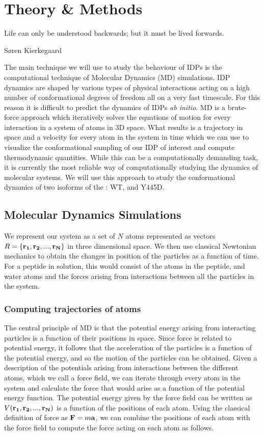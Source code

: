 \chapter{Theory \& Methods}
\epigraph{Life can only be understood backwards; but it must be lived forwards.}{S{\o}ren Kierkegaard}

The main technique we will use to study the behaviour of IDPs is the computational technique of Molecular Dynamics (MD) simulations. IDP dynamics are shaped by various types of physical interactions acting on a high number of conformational degrees of freedom all on a very fast timescale. For this reason it is difficult to predict the dynamics of IDPs {\it ab initio}. MD is a brute-force approach which iteratively solves the equations of motion for every interaction in a system of atoms in 3D space.  What results is a trajectory in space and a velocity for every atom in the system in time which we can use to visualize the conformational sampling of our IDP of interest and compute thermodynamic quantities. While this can be a computationally demanding task, it is currently the most reliable way of computationally studying the dynamics of molecular systems. We will use this approach to study the conformational dynamics of two isoforms of the \gct: WT, and Y445D.

\section{Molecular Dynamics Simulations}

We represent our system as a set of $N$ atoms represented as  vectors $R = \{\mathbf{r_1}, \mathbf{r_2}, ... , \mathbf{r_N}\}$ in three dimensional space. We then use classical Newtonian mechanics to obtain the changes in position of the particles as a function of time. For a peptide in solution, this would consist of the atoms in the peptide, and water atoms and the forces arising from interactions between all the particles in the system. 

\subsection{Computing trajectories of atoms}

The central principle of MD is that the potential energy arising from interacting particles is a function of their positions in space. Since force is related to potential energy, it follows that the acceleration of the particles is a function of the potential energy, and so the motion of the particles can be obtained. Given a description of the potentials arising from interactions between the different atoms, which we call a force field, we can iterate through every atom in the system and calculate the force that would arise as a function of the potential energy function. The potential energy given by the force field can be written as $V(\mathbf{r_1}, \mathbf{r_2}, ..., \mathbf{r_N})$ is a function of the positions of each atom. Using the classical definition of force as $\mathbf{F} = m\mathbf{a}$, we can combine the positions of each atom with the force field to compute the force acting on each atom as follows.  

